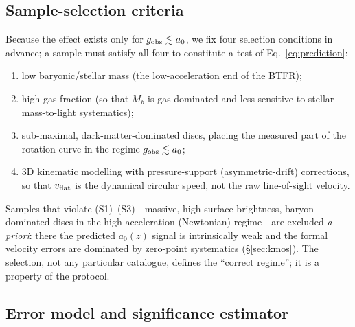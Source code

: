 \documentclass[fleqn,usenatbib]{mnras}
\newcommand{\azero}{a_0}
\begin{document}
\subsection{Sample-selection criteria}\label{sec:selection}

Because the effect exists only for $g_{\rm obs}\lesssim\azero$, we fix four
selection conditions in advance; a sample must satisfy all four to constitute a test
of Eq.~\eqref{eq:prediction}:
\begin{enumerate}
\item[(S1)] low baryonic/stellar mass (the low-acceleration end of the BTFR);
\item[(S2)] high gas fraction (so that $M_b$ is gas-dominated and less sensitive to
stellar mass-to-light systematics);
\item[(S3)] sub-maximal, dark-matter-dominated discs, placing the measured part of
the rotation curve in the regime $g_{\rm obs}\lesssim\azero$;
\item[(S4)] 3D kinematic modelling with pressure-support (asymmetric-drift)
corrections, so that $v_{\rm flat}$ is the dynamical circular speed, not the raw
line-of-sight velocity.
\end{enumerate}
Samples that violate (S1)--(S3)---massive, high-surface-brightness, baryon-dominated
discs in the high-acceleration (Newtonian) regime---are excluded \emph{a priori}:
there the predicted $\azero(z)$ signal is intrinsically weak and the formal velocity
errors are dominated by zero-point systematics (\S\ref{sec:kmos}). The selection,
not any particular catalogue, defines the ``correct regime''; it is a property of
the protocol.

\subsection{Error model and significance estimator}\label{sec:stat}
\end{document}
